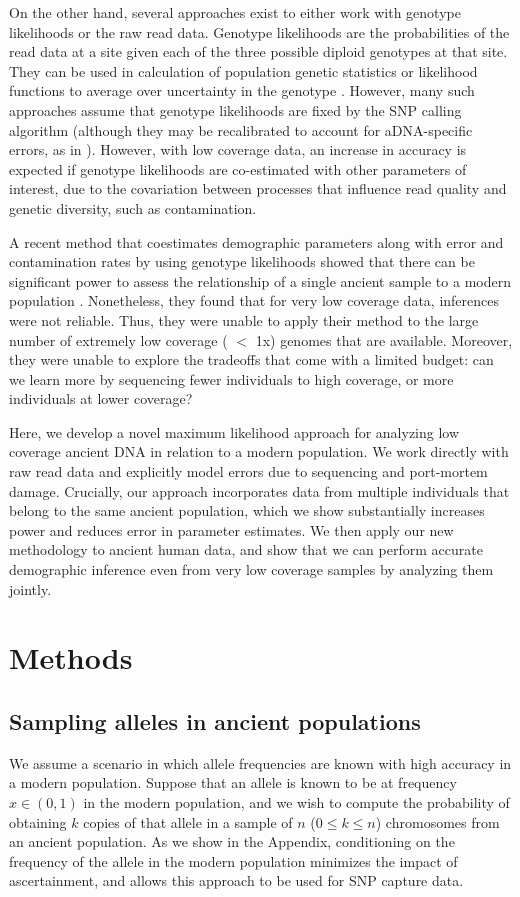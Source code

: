 \documentclass[11pt, oneside]{article}   	%
\begin{document}
On the other hand, several approaches exist to either work with genotype likelihoods or the raw read data. Genotype likelihoods are the probabilities of the read data at a site given each of the three possible diploid genotypes at that site. They can be used in calculation of population genetic statistics or likelihood functions to average over uncertainty in the genotype \citep{korneliussen2014angsd}. However, many such approaches assume that genotype likelihoods are fixed by the SNP calling algorithm (although they may be recalibrated to account for aDNA-specific errors, as in \citet{jonsson2013mapdamage2}). However, with low coverage data, an increase in accuracy is expected if genotype likelihoods are co-estimated with other parameters of interest, due to the covariation between processes that influence read quality and genetic diversity, such as contamination.

A recent method that coestimates demographic parameters along with error and contamination rates by using genotype likelihoods showed that there can be significant power to assess the relationship of a single ancient sample to a modern population \citep{racimo2016joint}. Nonetheless, they found that for very low coverage data, inferences were not reliable. Thus, they were unable to apply their method to the large number of extremely low coverage ( $<$ 1x) genomes that are available. Moreover, they were unable to explore the tradeoffs that come with a limited budget: can we learn more by sequencing fewer individuals to high coverage, or more individuals at lower coverage?

Here, we develop a novel maximum likelihood approach for analyzing low coverage ancient DNA in relation to a modern population. We work directly with raw read data and explicitly model errors due to sequencing and port-mortem damage. Crucially, our approach incorporates data from multiple individuals that belong to the same ancient population, which we show substantially increases power and reduces error in parameter estimates. We then apply our new methodology to ancient human data, and show that we can perform accurate demographic inference even from very low coverage samples by analyzing them jointly. 

\section{Methods}
\subsection{Sampling alleles in ancient populations}
We assume a scenario in which allele frequencies are known with high accuracy in a modern population. Suppose that an allele is known to be at frequency $x \in (0, 1)$ in the modern population, and we wish to compute the probability of obtaining $k$ copies of that allele in a sample of $n$ ($0 \leq k \leq n$) chromosomes from an ancient population. As we show in the Appendix, conditioning on the frequency of the allele in the modern population minimizes the impact of ascertainment, and allows this approach to be used for SNP capture data. 
\end{document}
